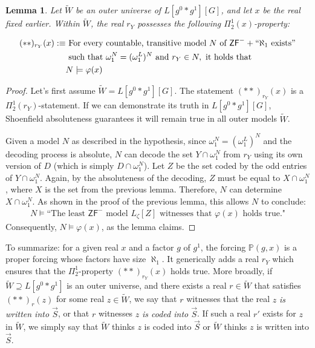 \documentclass[a4paper,11pt]{article}
\newtheorem{lemma}[theorem]{Lemma}
\newcommand{\forceP}{\mathbb{P}}
\newcommand{\ZFP}{\mathsf{ZF}^-}
\begin{document}
\begin{lemma}
Let $\tilde{W}$ be an outer universe of $L[g^0 \ast g^1][G]$, and let $x$ be the real fixed earlier. Within $\tilde{W}$, the real $r_Y$ possesses the following $\Pi^1_2(x)$-property:

\begin{align*}
({\ast}{\ast})_{r_Y} (x): \equiv & \text{ For every countable, transitive model } N \text{ of } \ZFP + ``\aleph_1 \text{ exists}" \\ & \text{ such that } \omega_1^N = (\omega_1^L)^N \text{ and } r_Y \in N, \text{ it holds that } \\ & N \models \varphi(x)
\end{align*}
\end{lemma}
\begin{proof}
Let's first assume $\tilde{W} = L[g^0 \ast g^1][G]$. The statement $(\ast \ast)_{r_Y}(x)$ is a $\Pi^1_2(r_Y)$-statement. If we can demonstrate its truth in $L[g^0 \ast g^1][G]$, Shoenfield absoluteness guarantees it will remain true in all outer models $\tilde{W}$.

Given a model $N$ as described in the hypothesis, since $\omega_1^N = (\omega_1^L)^N$ and the decoding process is absolute, $N$ can decode the set $Y \cap \omega_1^N$ from $r_Y$ using its own version of $D$ (which is simply $D \cap \omega_1^N$). Let $Z$ be the set coded by the odd entries of $Y \cap \omega_1^N$. Again, by the absoluteness of the decoding, $Z$ must be equal to $X \cap \omega_1^N$, where $X$ is the set from the previous lemma. Therefore, $N$ can determine $X \cap \omega_1^N$. As shown in the proof of the previous lemma, this allows $N$ to conclude:
\begin{align*}
 N \models \text{``The least } \ZFP \text{ model } L_{\zeta}[Z] \text{ witnesses that } \varphi(x) \text{ holds true."}
\end{align*}
Consequently, $N \models \varphi(x)$, as the lemma claims.
\end{proof}

To summarize: for a given real $x$ and a factor $g$ of $g^1$, the forcing $\forceP(g,x)$ is a proper forcing whose factors have size $\aleph_1$. It generically adds a real $r_Y$ which ensures that the $\Pi^1_2$-property $(\ast \ast)_{r_Y}(x)$ holds true.
More broadly, if $\tilde{W} \supseteq L[g^0 \ast g^1]$ is an outer universe, and there exists a real $r \in \tilde{W}$ that satisfies $(\ast \ast)_r(z)$ for some real $z \in \tilde{W}$, we say that $r$ witnesses that the real $z$ \emph{is written into $\vec{S}$}, or that $r$ witnesses $z$ \emph{is coded into $\vec{S}$}. If such a real $r'$ exists for $z$ in $\tilde{W}$, we simply say that $\tilde{W}$ thinks $z$ is coded into $\vec{S}$ or $\tilde{W}$ thinks $z$ is written into $\vec{S}$.
\end{document}
